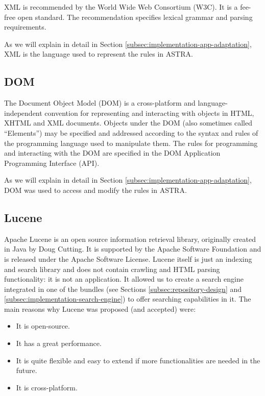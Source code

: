 XML is recommended by the World Wide Web Consortium (W3C). It is a fee-free 
open standard. The recommendation specifies lexical grammar and parsing 
requirements.

As we will explain in detail in Section
\ref{subsec:implementation-app-adaptation}, XML is the language used to
represent the rules in ASTRA.

\subsection{DOM}
\label{subsec:tech-dom}
The Document Object Model (DOM) is a cross-platform and language-independent 
convention for representing and interacting with objects in HTML, XHTML and 
XML documents. Objects under the DOM (also sometimes called ``Elements'') may be
specified and addressed according to the syntax and rules of the programming 
language used to manipulate them. The rules for programming and interacting
with the DOM are specified in the DOM Application Programming Interface (API).


As we will explain in detail in Section
\ref{subsec:implementation-app-adaptation}, DOM was used to access and modify
the rules in ASTRA.


\subsection{Lucene}
\label{sec:tech-lucene}
Apache Lucene is an open source information retrieval library, originally
created in Java by Doug Cutting. 
It is supported by the Apache Software Foundation and is released under the Apache 
Software License.
Lucene itself is just an indexing and search library and does not contain 
crawling and HTML parsing functionality: it is not an application. 
It allowed us to create a search engine integrated in one of the bundles
(see Sections \ref{subsec:repository-design} and
\ref{subsec:implementation-search-engine}) to offer searching capabilities in
it. The main reasons why Lucene was proposed (and accepted) were:

\begin{itemize}
	\item It is open-source.
	\item It has a great performance.
	\item It is quite flexible and easy to extend if more functionalities are 
	needed in the future.
	\item It is cross-platform.
\end{itemize}


